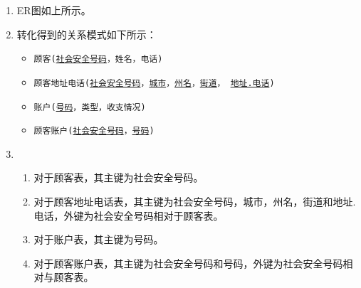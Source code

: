 \documentclass[10pt,a4paper]{article}
\begin{document}
	\begin{enumerate} 
		\item ER图如上所示。
		\item 转化得到的关系模式如下所示：
		\begin{itemize}
			\item \texttt{顾客(\underline{社会安全号码}，姓名，电话)}
			\item \texttt{顾客地址电话(\underline{社会安全号码}，\underline{城市}，\underline{州名}，\underline{街道}， \underline{地址.电话})}
			\item \texttt{账户(\underline{号码}，类型，收支情况)}
			\item \texttt{顾客账户(\underline{社会安全号码}，\underline{号码})}
		\end{itemize}
		\item \begin{enumerate}
			\item 对于顾客表，其主键为社会安全号码。
			\item 对于顾客地址电话表，其主键为社会安全号码，城市，州名，街道和地址.电话，外键为社会安全号码相对于顾客表。
			\item 对于账户表，其主键为号码。
			\item 对于顾客账户表，其主键为社会安全号码和号码，外键为社会安全号码相对与顾客表。
		\end{enumerate}
	\end{enumerate}
	\newpage
\end{document}
